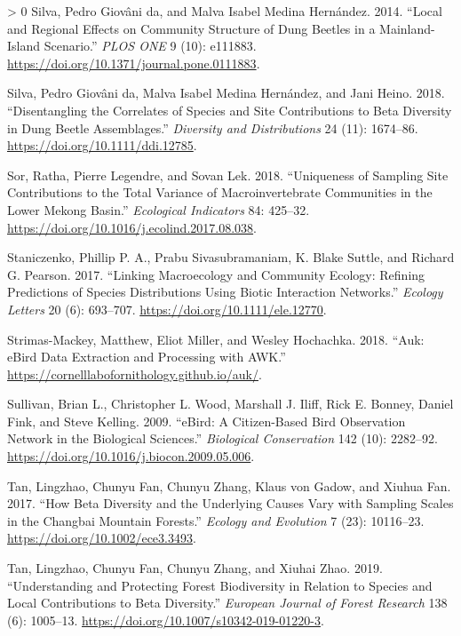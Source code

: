 \documentclass[10pt,oneside]{article}
\newlength{\cslhangindent}
\newenvironment{CSLReferences}[3] %
 {%
  \setlength{\parindent}{0pt}
  \ifodd #1 \everypar{\setlength{\hangindent}{\cslhangindent}}\ignorespaces\fi
  \ifnum #2 > 0
  \setlength{\parskip}{#2\baselineskip}
  \fi
 }%
 {}
\begin{document}
\begin{CSLReferences}{1}{0}
\leavevmode\hypertarget{ref-daSilva2014LocReg}{}%
Silva, Pedro Giovâni da, and Malva Isabel Medina Hernández. 2014.
{``Local and Regional Effects on Community Structure of Dung Beetles in
a Mainland-Island Scenario.''} \emph{PLOS ONE} 9 (10): e111883.
\url{https://doi.org/10.1371/journal.pone.0111883}.

\leavevmode\hypertarget{ref-daSilva2018DisCor}{}%
Silva, Pedro Giovâni da, Malva Isabel Medina Hernández, and Jani Heino.
2018. {``Disentangling the Correlates of Species and Site Contributions
to Beta Diversity in Dung Beetle Assemblages.''} \emph{Diversity and
Distributions} 24 (11): 1674--86.
\url{https://doi.org/10.1111/ddi.12785}.

\leavevmode\hypertarget{ref-Sor2018UniSam}{}%
Sor, Ratha, Pierre Legendre, and Sovan Lek. 2018. {``Uniqueness of
Sampling Site Contributions to the Total Variance of Macroinvertebrate
Communities in the Lower Mekong Basin.''} \emph{Ecological Indicators}
84: 425--32. \url{https://doi.org/10.1016/j.ecolind.2017.08.038}.

\leavevmode\hypertarget{ref-Staniczenko2017LinMac}{}%
Staniczenko, Phillip P. A., Prabu Sivasubramaniam, K. Blake Suttle, and
Richard G. Pearson. 2017. {``Linking Macroecology and Community Ecology:
Refining Predictions of Species Distributions Using Biotic Interaction
Networks.''} \emph{Ecology Letters} 20 (6): 693--707.
\url{https://doi.org/10.1111/ele.12770}.

\leavevmode\hypertarget{ref-Strimas-Mackey2018AukEbi}{}%
Strimas-Mackey, Matthew, Eliot Miller, and Wesley Hochachka. 2018.
{``Auk: eBird Data Extraction and Processing with AWK.''}
\url{https://cornelllabofornithology.github.io/auk/}.

\leavevmode\hypertarget{ref-Sullivan2009EbiCit}{}%
Sullivan, Brian L., Christopher L. Wood, Marshall J. Iliff, Rick E.
Bonney, Daniel Fink, and Steve Kelling. 2009. {``eBird: A Citizen-Based
Bird Observation Network in the Biological Sciences.''} \emph{Biological
Conservation} 142 (10): 2282--92.
\url{https://doi.org/10.1016/j.biocon.2009.05.006}.

\leavevmode\hypertarget{ref-Tan2017HowBet}{}%
Tan, Lingzhao, Chunyu Fan, Chunyu Zhang, Klaus von Gadow, and Xiuhua
Fan. 2017. {``How Beta Diversity and the Underlying Causes Vary with
Sampling Scales in the Changbai Mountain Forests.''} \emph{Ecology and
Evolution} 7 (23): 10116--23. \url{https://doi.org/10.1002/ece3.3493}.

\leavevmode\hypertarget{ref-Tan2019UndPro}{}%
Tan, Lingzhao, Chunyu Fan, Chunyu Zhang, and Xiuhai Zhao. 2019.
{``Understanding and Protecting Forest Biodiversity in Relation to
Species and Local Contributions to Beta Diversity.''} \emph{European
Journal of Forest Research} 138 (6): 1005--13.
\url{https://doi.org/10.1007/s10342-019-01220-3}.


\end{CSLReferences}
\end{document}
